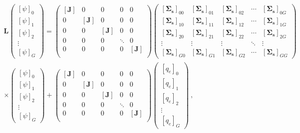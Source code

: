 \documentclass[12pt,twoside]{article}
\newcommand{\ve}[1]{\ensuremath{\mathbf{#1}}}
\begin{document}
\begin{multline}
    \ve{L}
    \begin{pmatrix}
      [\psi]_0 \\
      [\psi]_1 \\
      [\psi]_2 \\
      \vdots   \\
      [\psi]_G
    \end{pmatrix} =
    \begin{pmatrix}
      [\ve{J}] & 0 & 0 & 0 & 0 \\
      0 & [\ve{J}] & 0 & 0 & 0 \\
      0 & 0 & [\ve{J}] & 0 & 0 \\
      0 & 0 & 0 & \ddots & 0 \\
      0 & 0 & 0 & 0 & [\ve{J}] \\
    \end{pmatrix}
    \begin{pmatrix}
      [\ve{\Sigma_s}]_{00} & [\ve{\Sigma_s}]_{01} & [\ve{\Sigma_s}]_{02} & \cdots &
      [\ve{\Sigma_s}]_{0G} \\
      [\ve{\Sigma_s}]_{10} & [\ve{\Sigma_s}]_{11} & [\ve{\Sigma_s}]_{12} & \cdots &
      [\ve{\Sigma_s}]_{1G} \\
      [\ve{\Sigma_s}]_{20} & [\ve{\Sigma_s}]_{21} & [\ve{\Sigma_s}]_{22} & \cdots &
      [\ve{\Sigma_s}]_{2G} \\
      \vdots & \vdots & \vdots & \ddots & \vdots \\
      [\ve{\Sigma_s}]_{G0} & [\ve{\Sigma_s}]_{G1} & [\ve{\Sigma_s}]_{G2} & \cdots &
      [\ve{\Sigma_s}]_{GG}
    \end{pmatrix}\\
    \times
    \begin{pmatrix}
      [\psi]_0 \\
      [\psi]_1 \\
      [\psi]_2 \\
      \vdots   \\
      [\psi]_G
    \end{pmatrix}
    +
    \begin{pmatrix}
      [\ve{J}] & 0 & 0 & 0 & 0 \\
      0 & [\ve{J}] & 0 & 0 & 0 \\
      0 & 0 & [\ve{J}] & 0 & 0 \\
      0 & 0 & 0 & \ddots & 0 \\
      0 & 0 & 0 & 0 & [\ve{J}] \\
    \end{pmatrix}
    \begin{pmatrix}
      [q_e]_0 \\
      [q_e]_1 \\
      [q_e]_2 \\
      \vdots   \\
      [q_e]_G
    \end{pmatrix}\:,
    \label{eq:matrix-transport}
\end{multline}
\end{document}
